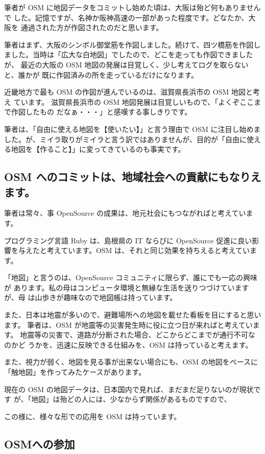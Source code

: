 \documentclass[mingoth,a4paper]{jsarticle}
\begin{document}
筆者が OSM に地図データをコミットし始めた頃は、大阪は殆ど何もありませんで
した。記憶ですが、名神か阪神高速の一部があった程度です。どなたか、大阪を
通過された方が作図されたのだと思います。

筆者はまず、大阪のシンボル御堂筋を作図しました。続けて、四ツ橋筋を作図し
ました。当時は「広大な白地図」でしたので、どこを走っても作図できましたが、
最近の大阪の OSM 地図の発展は目覚しく、少し考えてログを取らないと、誰かが
既に作図済みの所を走っているだけになります。

近畿地方で最も OSM の作図が進んでいるのは、滋賀県長浜市の OSM 地図と考え
ています。
滋賀県長浜市の OSM 地図発展は目覚しいもので、「よくぞここまで作図したもの
だなぁ・・・」と感嘆する事しきりです。

筆者は、「自由に使える地図を【使いたい】」と言う理由で OSM に注目し始めま
した。が、ミイラ取りがミイラと言う訳ではありませんが、目的が「自由に使え
る地図を【作ること】」に変ってきているのも事実です。

\subsection{OSM へのコミットは、地域社会への貢献にもなりえます。}

筆者は常々、事 OpenSource の成果は、地元社会にもつながればと考えています。

プログラミング言語 Ruby は、島根県の IT ならびに OpenSource 促進に良い影
響を与えたと考えています。OSM は、それと同じ効果を持ちえると考えています。

「地図」と言うのは、OpenSource コミュニティに限らず、誰にでも一応の興味が
あります。私の母はコンピュータ環境と無縁な生活を送りつづけていますが、母
は山歩きが趣味なので地図帳は持っています。

また、日本は地震が多いので、避難場所への地図を載せた看板を目にすると思い
ます。
筆者は、OSM が地震等の災害発生時に役に立つ日が来ればと考えています。
地震等の災害で、道路が分断された場合、どこからどこまでが通行不可なのかど
うかを、迅速に反映できる仕組みを、OSM は持っていると考えます。

また、視力が弱く、地図を見る事が出来ない場合にも、OSM の地図をベースに
「触地図」を作ってみたケースがあります。

現在の OSM の地図データは、日本国内で見れば、まだまだ足りないのが現状です
が、「地図」は殆どの人には、少なからず関係があるものですので、

この様に、様々な形での応用を OSM は持っています。

\subsection{OSMへの参加}
\end{document}
